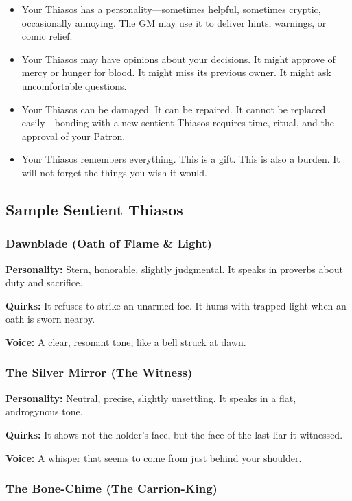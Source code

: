 \begin{itemize}
\item Your Thiasos has a personality—sometimes helpful, sometimes cryptic, occasionally annoying. The GM may use it to deliver hints, warnings, or comic relief.
\item Your Thiasos may have opinions about your decisions. It might approve of mercy or hunger for blood. It might miss its previous owner. It might ask uncomfortable questions.
\item Your Thiasos can be damaged. It can be repaired. It cannot be replaced easily—bonding with a new sentient Thiasos requires time, ritual, and the approval of your Patron.
\item Your Thiasos remembers everything. This is a gift. This is also a burden. It will not forget the things you wish it would.
\end{itemize}

\subsection{Sample Sentient Thiasos}

\subsubsection{Dawnblade (Oath of Flame \& Light)}

\textbf{Personality:} Stern, honorable, slightly judgmental. It speaks in proverbs about duty and sacrifice.

\textbf{Quirks:} It refuses to strike an unarmed foe. It hums with trapped light when an oath is sworn nearby.

\textbf{Voice:} A clear, resonant tone, like a bell struck at dawn.

\subsubsection{The Silver Mirror (The Witness)}

\textbf{Personality:} Neutral, precise, slightly unsettling. It speaks in a flat, androgynous tone.

\textbf{Quirks:} It shows not the holder's face, but the face of the last liar it witnessed.

\textbf{Voice:} A whisper that seems to come from just behind your shoulder.

\subsubsection{The Bone-Chime (The Carrion-King)}


